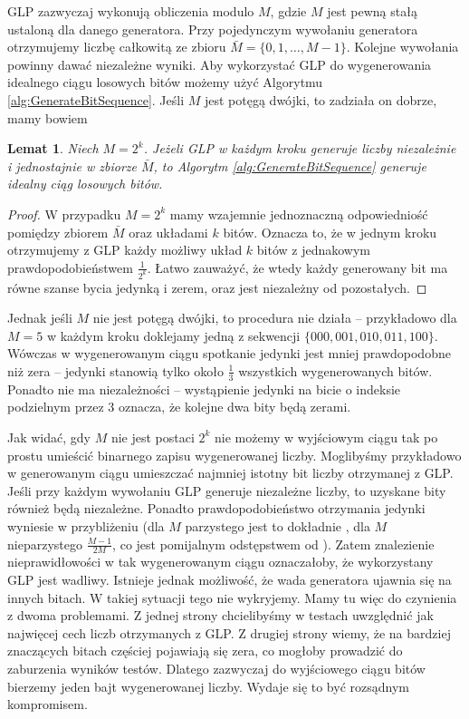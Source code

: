 \documentclass[a4paper,11pt,twoside]{book}
\newtheorem{lemat}[twier]{Lemat}
\theoremstyle{definition}
\begin{document}
GLP zazwyczaj wykonują obliczenia modulo $M$, gdzie $M$ jest pewną stałą ustaloną dla danego generatora. Przy pojedynczym wywołaniu generatora otrzymujemy liczbę całkowitą ze zbioru $\bar{M} = \{0, 1, \ldots, M-1 \}$. Kolejne wywołania powinny dawać niezależne wyniki. Aby wykorzystać GLP do wygenerowania idealnego ciągu losowych bitów możemy użyć Algorytmu \ref{alg:GenerateBitSequence}. Jeśli $M$ jest potęgą dwójki, to zadziała on dobrze, mamy bowiem
\begin{lemat}
 Niech $M = 2^k$. Jeżeli GLP w każdym kroku generuje liczby niezależnie i jednostajnie w zbiorze $\bar{M}$, to Algorytm \ref{alg:GenerateBitSequence} generuje idealny ciąg losowych bitów.
\end{lemat}
\begin{proof}
 W przypadku $M = 2^k$ mamy wzajemnie jednoznaczną odpowiedniość pomiędzy zbiorem $\bar{M}$ oraz układami $k$ bitów. Oznacza to, że w jednym kroku otrzymujemy z GLP każdy możliwy układ $k$ bitów z jednakowym prawdopodobieństwem $\frac{1}{2^k}$. Łatwo zauważyć, że wtedy każdy generowany bit ma równe szanse bycia jedynką i zerem, oraz jest niezależny od pozostałych.
\end{proof}

Jednak jeśli $M$ nie jest potęgą dwójki, to procedura nie działa -- przykładowo dla $M=5$ w każdym kroku doklejamy jedną z sekwencji $\{000, 001, 010, 011, 100\}$. Wówczas w wygenerowanym ciągu spotkanie jedynki jest mniej prawdopodobne niż zera -- jedynki stanowią tylko około $\frac{1}{3}$ wszystkich wygenerowanych bitów. Ponadto nie ma niezależności -- wystąpienie jedynki na bicie o indeksie podzielnym przez 3 oznacza, że kolejne dwa bity będą zerami.

Jak widać, gdy $M$ nie jest postaci $2^k$ nie możemy w wyjściowym ciągu tak po prostu umieścić binarnego zapisu wygenerowanej liczby. Moglibyśmy przykładowo w generowanym ciągu umieszczać najmniej istotny bit liczby otrzymanej z GLP. Jeśli przy każdym wywołaniu GLP generuje niezależne liczby, to uzyskane bity również będą niezależne. Ponadto prawdopodobieństwo otrzymania jedynki wyniesie w przybliżeniu \textonehalf (dla $M$ parzystego jest to dokładnie \textonehalf, dla $M$ nieparzystego $\frac{M-1}{2M}$, co jest pomijalnym odstępstwem od \textonehalf). Zatem znalezienie nieprawidłowości w tak wygenerowanym ciągu oznaczałoby, że wykorzystany GLP jest wadliwy. Istnieje jednak możliwość, że wada generatora ujawnia się na innych bitach. W takiej sytuacji tego nie wykryjemy. Mamy tu więc do czynienia z dwoma problemami. Z jednej strony chcielibyśmy w testach uwzględnić jak najwięcej cech liczb otrzymanych z GLP. Z drugiej strony wiemy, że na bardziej znaczących bitach częściej pojawiają się zera, co mogłoby prowadzić do zaburzenia wyników testów. Dlatego zazwyczaj do wyjściowego ciągu bitów bierzemy jeden bajt wygenerowanej liczby. Wydaje się to być rozsądnym kompromisem.
\end{document}
